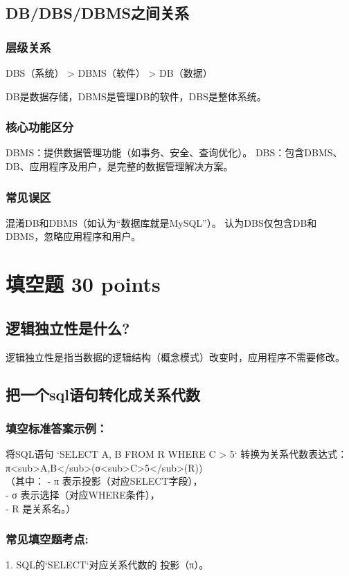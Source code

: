 \documentclass[a4paper,12pt,UTF8,fontset=none]{ctexart}
\begin{document}
\subsection{DB/DBS/DBMS之间关系}
\subsubsection{层级关系}
DBS（系统） > DBMS（软件） > DB（数据）

DB是数据存储，DBMS是管理DB的软件，DBS是整体系统。
\subsubsection{核心功能区分}
DBMS：提供数据管理功能（如事务、安全、查询优化）。
DBS：包含DBMS、DB、应用程序及用户，是完整的数据管理解决方案。
\subsubsection{常见误区}
混淆DB和DBMS（如认为“数据库就是MySQL”）。
认为DBS仅包含DB和DBMS，忽略应用程序和用户。
\section{填空题 30 points}
\subsection{逻辑独立性是什么?}
逻辑独立性是指当数据的逻辑结构（概念模式）改变时，应用程序不需要修改。
\subsection{把一个sql语句转化成关系代数}
\subsubsection{填空标准答案示例：}
将SQL语句 `SELECT A, B FROM R WHERE C > 5` 转换为关系代数表达式：  \\
π<sub>A,B</sub>(σ<sub>C>5</sub>(R))\\
（其中：  
- π 表示投影（对应SELECT字段），  \\
- σ 表示选择（对应WHERE条件），  \\
- R 是关系名。）\\

\subsubsection{常见填空题考点:}
1. SQL的`SELECT`对应关系代数的 投影（π）。  
\end{document}
